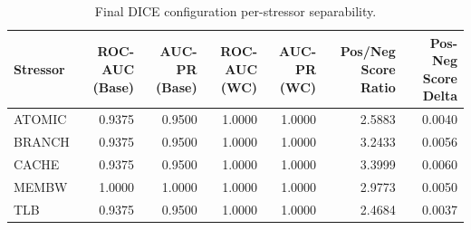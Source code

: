\begin{table}[t]
\centering
\caption{Final DICE configuration per-stressor separability.}
\label{tab:dice_full_stressor}
\footnotesize
\begin{tabular}{lrrrrrr}
\toprule
Stressor & ROC-AUC (Base) & AUC-PR (Base) & ROC-AUC (WC) & AUC-PR (WC) & Pos/Neg Score Ratio & Pos-Neg Score Delta \\
\midrule
ATOMIC & 0.9375 & 0.9500 & 1.0000 & 1.0000 & 2.5883 & 0.0040 \\
BRANCH & 0.9375 & 0.9500 & 1.0000 & 1.0000 & 3.2433 & 0.0056 \\
CACHE & 0.9375 & 0.9500 & 1.0000 & 1.0000 & 3.3999 & 0.0060 \\
MEMBW & 1.0000 & 1.0000 & 1.0000 & 1.0000 & 2.9773 & 0.0050 \\
TLB & 0.9375 & 0.9500 & 1.0000 & 1.0000 & 2.4684 & 0.0037 \\
\bottomrule
\end{tabular}

\end{table}
